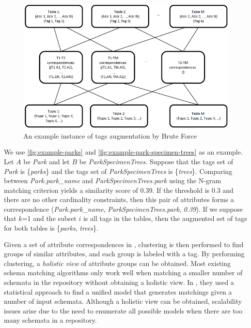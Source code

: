 \begin{figure}
  \centering
  \includegraphics[width=5in]{figures/an-example-instance-brute-force.png}
  \caption{An example instance of tags augmentation by Brute Force}
  \label{fig:an-example-instance-brute-force}
\end{figure}

We use \autoref{fig:example-parks} and \autoref{fig:example-park-specimen-trees} as an example. Let $A$ be \textit{Park} and let $B$ be \textit{ParkSpecimenTrees}. Suppose that the tags set of \textit{Park} is \{\textit{parks}\} and the tags set of \textit{ParkSpecimenTrees} is \{\textit{trees}\}. Comparing between \textit{Park.park\_name} and \textit{ParkSpecimenTrees.park} using the N-gram matching criterion yields a similarity score of 0.39. If the threshold is 0.3 and there are no other cardinality constraints, then this pair of attributes forms a correspondence (\textit{Park.park\_name}, \textit{ParkSpecimenTrees.park}, \textit{0.39}). If we suppose that $k$=1 and the subset $i$ is all tags in the tables, then the augmented set of tags for both tables is \{\textit{parks}, \textit{trees}\}.

Given a set of attribute correspondences in \cite{Smith2011Unity}, clustering is then performed to find groups of similar attributes, and each group is labeled with a tag. By performing clustering, a \textit{holistic view} of attribute groups can be obtained. Most existing schema matching algorithms only work well when matching a smaller number of schemata in the repository without obtaining a holistic view. In \cite{10.1145/2396761.2398468}, they used a statistical approach to find a unified model that generates matchings given a number of input schemata. Although a holistic view can be obtained, scalability issues arise due to the need to enumerate all possible models when there are too many schemata in a repository.

